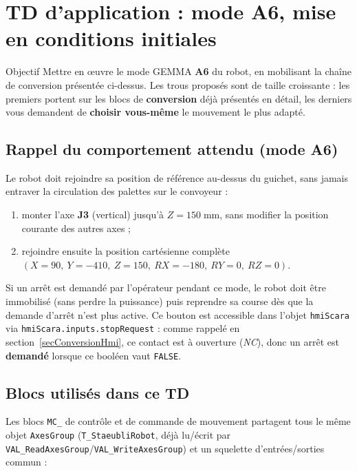 \section{TD d'application : mode A6, mise en conditions initiales}
\label{secTdA6}

\begin{UPSTIinfor}{Objectif}
Mettre en œuvre le mode GEMMA \textbf{A6} du robot, en mobilisant la
chaîne de conversion présentée ci-dessus. Les trous proposés sont de
taille croissante : les premiers portent sur les blocs de
\textbf{conversion} déjà présentés en détail, les derniers vous demandent
de \textbf{choisir vous-même} le mouvement le plus adapté.
\end{UPSTIinfor}

\subsection{Rappel du comportement attendu (mode A6)}

Le robot doit rejoindre sa position de référence au-dessus du guichet,
sans jamais entraver la circulation des palettes sur le convoyeur :

\begin{enumerate}
    \item monter l'axe \textbf{J3} (vertical) jusqu'à $Z=150\;\text{mm}$,
    sans modifier la position courante des autres axes ;
    \item rejoindre ensuite la position cartésienne complète
    $(X=90,\ Y=-410,\ Z=150,\ RX=-180,\ RY=0,\ RZ=0)$.
\end{enumerate}

Si un arrêt est demandé par l'opérateur pendant ce mode, le robot doit
être immobilisé (sans perdre la puissance) puis reprendre sa course dès
que la demande d'arrêt n'est plus active. Ce bouton est accessible dans
l'objet \texttt{hmiScara} via
\texttt{hmiScara.inputs.stopRequest} : comme rappelé en
section~\ref{secConversionHmi}, ce contact est à ouverture (\emph{NC}),
donc un arrêt est \textbf{demandé} lorsque ce booléen vaut
\texttt{FALSE}.

\subsection{Blocs utilisés dans ce TD}

Les blocs \texttt{MC\_} de contrôle et de commande de mouvement partagent
tous le même objet \texttt{AxesGroup} (\texttt{T\_StaeubliRobot}, déjà
lu/écrit par \texttt{VAL\_ReadAxesGroup}/\texttt{VAL\_WriteAxesGroup}) et
un squelette d'entrées/sorties commun :


